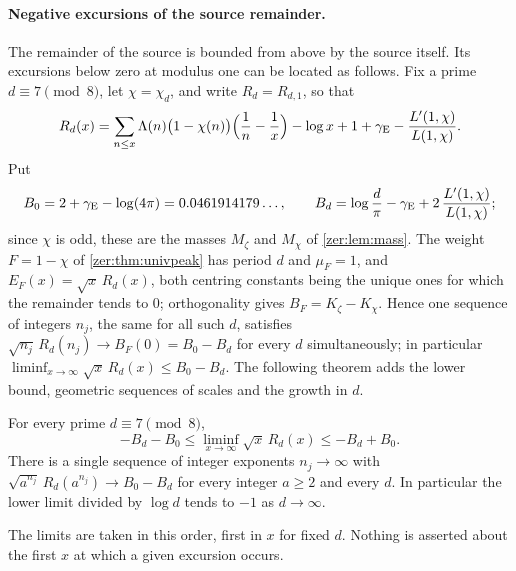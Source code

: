 \paragraph{Negative excursions of the source remainder.}
The remainder of the source is bounded from above by the source itself. Its excursions below
zero at modulus one can be located as follows. Fix a prime $d\equiv7\pmod8$, let
$\chi=\chi_d$, and write $R_d=R_{d,1}$, so that
\[
 R_d(x)=\sum_{n\le x}\Lambda(n)\bigl(1-\chi(n)\bigr)\Bigl(\frac1n-\frac1x\Bigr)
 -\log x+1+\gamma_{\mathrm{E}}-\frac{L'(1,\chi)}{L(1,\chi)} .
\]
Put
\[
 B_0=2+\gamma_{\mathrm{E}}-\log(4\pi)=0.0461914179\ldots,\qquad
 B_d=\log\frac d\pi-\gamma_{\mathrm{E}}+2\,\frac{L'(1,\chi)}{L(1,\chi)} ;
\]
since $\chi$ is odd, these are the masses $M_\zeta$ and $M_\chi$ of \cref{zer:lem:mass}. The weight
$F=1-\chi$ of \cref{zer:thm:univpeak} has period $d$ and $\mu_F=1$, and $E_F(x)=\sqrt x\,R_d(x)$, both
centring constants being the unique ones for which the remainder tends to $0$; orthogonality gives
$B_F=K_\zeta-K_\chi$. Hence one sequence of integers $n_j$, the same for all such $d$, satisfies
$\sqrt{n_j}\,R_d(n_j)\to B_F(0)=B_0-B_d$ for every $d$ simultaneously; in particular
$\liminf_{x\to\infty}\sqrt x\,R_d(x)\le B_0-B_d$. The following theorem adds the lower bound,
geometric sequences of scales and the growth in $d$.

\begin{theorem}\label{ana:thm:excursion}
For every prime $d\equiv7\pmod8$,
\[
 -B_d-B_0\le\liminf_{x\to\infty}\sqrt x\,R_d(x)\le-B_d+B_0 .
\]
There is a single sequence of integer exponents $n_j\to\infty$ with
$\sqrt{a^{n_j}}\,R_d(a^{n_j})\to B_0-B_d$ for every integer $a\ge2$ and every $d$. In
particular the lower limit divided by $\log d$ tends to $-1$ as $d\to\infty$.
\end{theorem}

The limits are taken in this order, first in $x$ for fixed $d$. Nothing is asserted about the
first $x$ at which a given excursion occurs.

